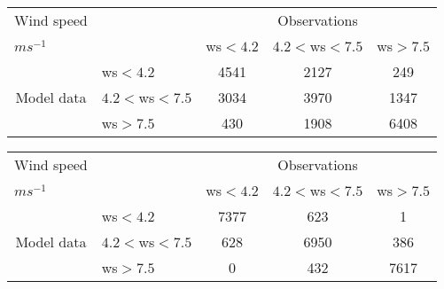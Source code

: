 \documentclass[11pt,english]{article}
\begin{document}
\begin{table}[]
\begin{center}
\begin{tabular}{llccc}
\hline
{Wind speed}                                       &                                                    & \multicolumn{3}{c}{Observations}                 \\
{$m s^{-1}$}                                       &                             & ws$<4.2$   & $4.2<$ws$<7.5$ & ws$>7.5$ \\
\hline
\multicolumn{1}{c}{\multirow{3}{*}{Model data}}  & ws$<4.2$          & 4541                & 2127                       & 249              \\
                                                 & $4.2<$ws$<7.5$ & 3034                & 3970                       & 1347              \\
                                                 & ws$>7.5$          & 430                & 1908                       & 6408              \\
\hline
\end{tabular}
\end{center}
\label{tab:contingency}
\end{table}
\clearpage

\begin{table}[]
\begin{center}
\begin{tabular}{llccc}
\hline
{Wind speed}                                       &                                                    & \multicolumn{3}{c}{Observations}                 \\
{$m s^{-1}$}                                       &                             & ws$<4.2$   & $4.2<$ws$<7.5$ & ws$>7.5$ \\
\hline
\multicolumn{1}{c}{\multirow{3}{*}{Model data}}  & ws$<4.2$          & 7377                & 623                       & 1              \\
                                                 & $4.2<$ws$<7.5$ & 628                & 6950                       & 386              \\
                                                 & ws$>7.5$          & 0                & 432                       & 7617              \\
\hline
\end{tabular}
\end{center}
\label{tab:contingency}
\end{table}
\clearpage
\end{document}
